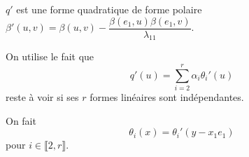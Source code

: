 \documentclass[a4paper, 12pt]{article}
\begin{document}
\begin{demonstration}
\begin{enumerate}
\begin{description}
            $q'$ est une forme quadratique de forme polaire $\beta'(u, v) = \beta(u, v) - \dfrac{\beta(e_1, u) \beta(e_1, v)}{\lambda_{11}}$.

            On utilise le fait que
            $$
            q'(u) = \sum_{i=2}^r \alpha_i \theta_i'(u)
            $$
            reste à voir si ses $r$ formes linéaires sont indépendantes.

            On fait
            $$
            \theta_i(x) = \theta_i'(y - x_1 e_1)
            $$
            pour $i \in \llbracket 2, r \rrbracket$.
        \end{description}
    \end{enumerate}
\end{demonstration}
\end{document}

